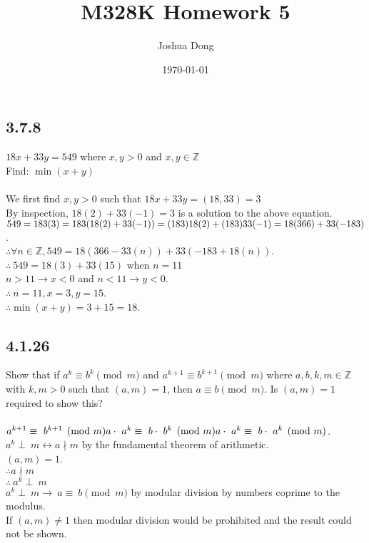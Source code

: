 \documentclass{article}
\begin{document}
\title{M328K\: Homework 5}
\author{Joshua Dong}
\date{\today}
\maketitle

\subsection{3.7.8}
$18x + 33y = 549$ where $x,y > 0$ and $x,y \in \mathbb{Z}$
\\Find: $\min(x+y)$
\\
\\We first find $x, y > 0$ such that $18x + 33y = (18, 33) = 3$
\\By inspection, $18(2)+33(-1)=3$ is a solution to the above equation.
\\$549=183(3)
\\=183(18(2)+33(-1))
\\=(183)18(2) + (183)33(-1)
\\=18(366)+33(-183)$.
\\$\therefore \forall n \in \mathbb{Z}, 549=18(366-33(n))+33(-183+18(n))$.
\\$\therefore\ 549=18(3)+33(15)$ when $n=11$
\\$n>11 \rightarrow x<0$ and $n<11 \rightarrow y<0$.
\\$\therefore\ n=11, x=3, y=15$.
\\$\therefore \min(x+y)=3+15=18$.

\subsection{4.1.26}
Show that if $a^k \equiv b^k \pmod{m}$
and $a^{k+1} \equiv b^{k+1} \pmod{m}$
where $a, b, k, m \in \mathbb{Z}$ with $k,m>0$
such that $(a,m) = 1$,
then $a \equiv b \pmod{m}$.
Is $(a,m) = 1$ required to show this?
\\
\\$a^{k+1} \equiv\ b^{k+1} \pmod{m}
\\a \cdot\ a^k \equiv\ b \cdot\ b^k \pmod{m}
\\a \cdot\ a^k \equiv\ b \cdot\ a^k \pmod{m}$.
\\$a^k \perp\ m \leftrightarrow a \nmid m$ by the fundamental theorem of arithmetic.
\\$(a,m)=1$.
\\$\therefore a \nmid m$
\\$\therefore\ a^k \perp\ m$
\\$a^k \perp\ m \rightarrow\ a \equiv\ b \pmod{m}$ by modular division by numbers coprime to the modulus.
\\If $(a,m)\neq1$ then modular division would be prohibited and the result could not be shown.
\end{document}
